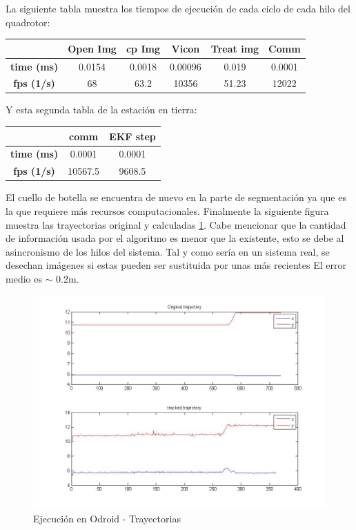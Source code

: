 	La siguiente tabla muestra los tiempos de ejecuci\'on de cada ciclo de cada hilo del quadrotor:
	\newline
	\newline
	{
	\centering
		\begin{tabular}{|c|c|c|c|c|c|}
		\hline  					&  Open Img	&  cp Img 	& Vicon 	& Treat img & Comm  		\\ 
		\hline  \textbf{time (ms)}	& 	0.0154	& 0.0018	&	0.00096	&  	 0.019	&	0.0001		\\ 
		\hline  \textbf{fps (1/s)}	&  	68		&  63.2		&  10356	&  	51.23	&	12022		\\ 
		\hline 
		\end{tabular} 
	}
	\newline
	
	Y esta segunda tabla de la estaci\'on en tierra:
	\newline
	
	{
	\centering
		\begin{tabular}{|c|c|c|}
		\hline  					&  comm		&  EKF step	\\
		\hline  \textbf{time (ms)}	& 	0.0001	& 	0.0001	\\
		\hline  \textbf{fps (1/s)}	&  	10567.5	&  	9608.5	\\
		\hline 
		\end{tabular} 
	}
	\newline
	
	El cuello de botella se encuentra de nuevo en la parte de segmentaci\'on ya que es la que requiere m\'as recursos computacionales.
	Finalmente la siguiente figura muestra las trayectorias original y calculadas \ref{fig:arch_trajs}. Cabe mencionar que la cantidad de informaci\'on usada por el algoritmo es menor que la existente, esto se debe al asincronismo de los hilos del sistema. Tal y como ser\'ia en un sistema real, se desechan im\'agenes si estas pueden ser sustituida por unas m\'as recientes El error medio es $\sim$ 0.2m.
	
	\begin{figure}[ph]
		\centering
		\includegraphics[width=0.5\linewidth]{../Images/c4/arch_trajs}
		\caption{Ejecuci\'on en Odroid - Trayectorias}
		\label{fig:arch_trajs}
	\end{figure}

